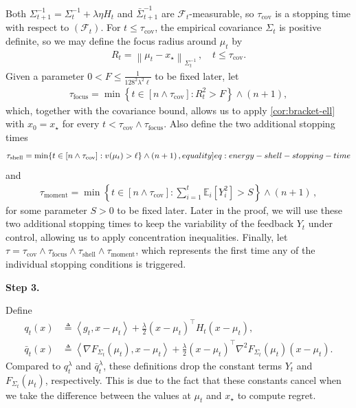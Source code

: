 \documentclass[12pt,cleveref]{jmlr}
\newcommand{\eqlabel}[1]{\label[equality]{#1}}
\newcommand{\proofstepinline}[1]{%
    \par\addvspace{0.6\baselineskip}
    \noindent
    {\normalfont\normalsize\bfseries\color{blue!55!black}Step #1.}\enspace\ignorespaces
}
\newcommand{\E}{\mathbb E}
\newcommand{\F}{\mathcal F}
\newcommand{\1}{\mathbf 1}
\newcommand{\ip}[2]{\left\langle #1,#2\right\rangle}
\begin{document}
Both $\Sigma_{t+1}^{-1} = \Sigma_t^{-1} + \lambda\eta H_t$ and $\bar{\Sigma}_{t+1}^{-1}$ are $\F_t$-measurable, so $\tau_{\mathrm{cov}}$ is a stopping time with respect to $(\F_t)$.
For $t \leq \tau_{\mathrm{cov}}$, the empirical covariance $\Sigma_t$ is positive definite, so we may define the focus radius around $\mu_t$ by
\begin{align}
    R_t = \left\|\mu_t - x_\star\right\|_{\Sigma_t^{-1}}\,, \quad t \leq \tau_{\mathrm{cov}}.
\end{align}
Given a parameter $0 < F \leq \frac{1}{128^2\lambda^2 \ell}$ to be fixed later, let
\begin{align}
    \tau_{\mathrm{focus}}
    =
    \min\left\{
        t \in [n\wedge \tau_{\mathrm{cov}}]:
        R_t^2 > F
    \right\}
    \wedge (n + 1),
\end{align}
which, together with the covariance bound, allows us to apply \cref{cor:bracket-ell} with $x_0=x_\star$ for every $t<\tau_{\mathrm{cov}}\wedge\tau_{\mathrm{focus}}$.
Also define the two additional stopping times
\begin{align}
    \tau_{\mathrm{shell}}
    =\min\{t\in[n \wedge \tau_{\mathrm{cov}}]:v(\mu_{t})>\ell\}\wedge (n+1)\,,
    \eqlabel{eq:energy-shell-stopping-time}
\end{align}
and
\begin{align}
    \tau_{\mathrm{moment}}
    =\min\left\{
        t \in [n \wedge \tau_{\mathrm{cov}}]: \sum_{i=1}^{t} \E_i[Y_i^2] > S
    \right\}\wedge (n+1)\,,
\end{align}
for some parameter $S > 0$ to be fixed later.
Later in the proof, we will use these two additional stopping times to keep the variability of the feedback $Y_t$ under control, allowing us to apply concentration inequalities.
Finally, let $\tau = \tau_{\mathrm{cov}} \wedge \tau_{\mathrm{focus}} \wedge \tau_{\mathrm{shell}} \wedge \tau_{\mathrm{moment}}$,
which represents the first time any of the individual stopping conditions is triggered.

\proofstepinline{3}
Define
\begin{align}
    q_t(x)
    & \triangleq
    \ip{g_t}{x-\mu_t}
    +\frac{\lambda}{2}(x-\mu_t)^\top H_t(x-\mu_t),
    \\
    \bar q_t(x)
    & \triangleq
    \ip{\nabla F_{\Sigma_t}(\mu_t)}{x-\mu_t}
    +\frac{\lambda}{2}(x-\mu_t)^\top
    \nabla^2 F_{\Sigma_t}(\mu_t)(x-\mu_t).
\end{align}
Compared to $q_t^\lambda$ and $\bar q_t^\lambda$, these definitions
drop the constant terms $Y_t$ and $F_{\Sigma_t}(\mu_t)$, respectively.
This is due to the fact that these constants cancel when we take
the difference between the values at $\mu_t$ and $x_\star$ to compute regret.
\end{document}
